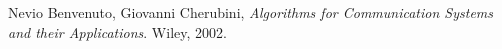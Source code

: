 \documentclass[a4paper,11.5pt]{article}
\begin{document}




\begin{thebibliography}{15}
	
	Nevio Benvenuto, Giovanni Cherubini,
	\textit{Algorithms for Communication Systems and their Applications}. 
	Wiley, 2002.
	

	
\end{thebibliography}
\end{document}
